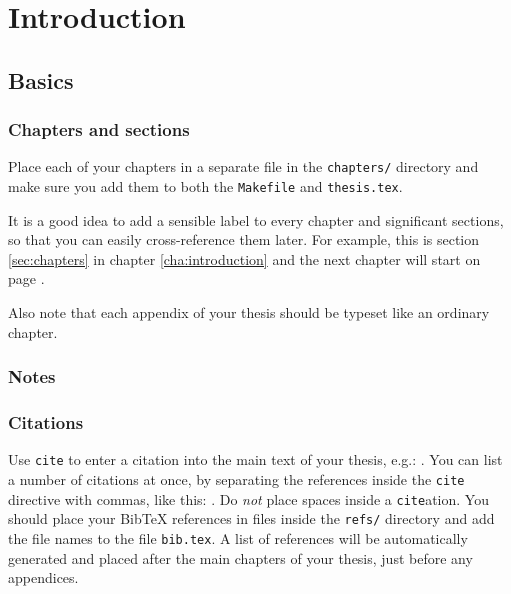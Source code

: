\chapter{\label{cha:introduction}Introduction}


\section{Basics}

\subsection{\label{sec:chapters}Chapters and sections}

Place each of your chapters in a separate file in the \verb!chapters/!
directory and make sure you add them to both the \verb!Makefile! and
\verb!thesis.tex!.

It is a good idea to add a sensible label to every chapter and
significant sections, so that you can easily cross-reference them
later. For example, this is section \ref{sec:chapters} in chapter
\ref{cha:introduction} and the next chapter will start on page
\pageref{cha:example}.

Also note that each appendix of your thesis should be typeset like an
ordinary chapter.

\subsection{Notes}


\subsection{Citations}

Use \verb!cite! to enter a citation into the main text of your thesis,
e.g.: \cite{Roscoe+97}. You can list a number of citations at once, by
separating the references inside the \verb!cite! directive with
commas, like this: \cite{Geurts90,Martin96,Welch+99}. Do \emph{not}
place spaces inside a \verb!cite!ation. You should place your BibTeX
references in files inside the \verb!refs/! directory and add the file
names to the file \verb!bib.tex!. A list of references will be
automatically generated and placed after the main chapters of your
thesis, just before any appendices.


